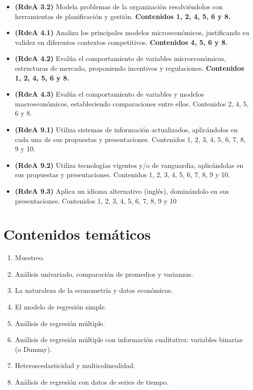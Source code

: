 \documentclass[10pt,a4paper]{article}
\begin{document}
\begin{itemize}
    \item  {\bf (RdeA 3.2)} Modela problemas de la organización resolviéndolos con herramientas de planificación y gestión. \textbf{Contenidos 1, 2, 4, 5, 6 y 8.}
    \item {\bf (RdeA 4.1)} Analiza los principales modelos microeconómicos, justificando su validez en diferentes contextos competitivos. \textbf{Contenidos 4, 5, 6 y 8.}
    \item {\bf (RdeA 4.2)} Evalúa el comportamiento de variables microeconómicas, estructuras de mercado, proponiendo incentivos y regulaciones. \textbf{Contenidos 1, 2, 4, 5, 6 y 8.}

\item {\bf (RdeA 4.3)}   Evalúa el comportamiento de variables y modelos macroeconómicos,
estableciendo comparaciones entre ellos. Contenidos 2, 4, 5, 6 y 8.
\item {\bf (RdeA 9.1)} Utiliza sistemas de información actualizados, aplicándolos en cada una de sus
propuestas y presentaciones. Contenidos 1, 2, 3, 4, 5, 6, 7, 8, 9 y 10.
\item {\bf (RdeA 9.2)} Utiliza tecnologías vigentes y/o de vanguardia, aplicándolas en sus propuestas y
presentaciones. Contenidos 1, 2, 3, 4, 5, 6, 7, 8, 9 y 10.
\item {\bf (RdeA 9.3)} Aplica un idioma alternativo (inglés), dominándolo en sus presentaciones.
Contenidos 1, 2, 3, 4, 5, 6, 7, 8, 9 y 10
\end{itemize}

\section{Contenidos temáticos}

\begin{enumerate}
    \item Muestreo.
    \item Análisis univariado, comparación de promedios y varianzas.
    \item La naturaleza de la econometría y datos económicos.
    \item El modelo de regresión simple.
    \item Análisis de regresión múltiple.
    \item Análisis de regresión múltiple con información cualitativa: variables binarias (o Dummy).
    \item Heteroscedasticidad y multicolinealidad.
    \item Análisis de regresión con datos de series de tiempo.
   
\end{enumerate}
\end{document}
